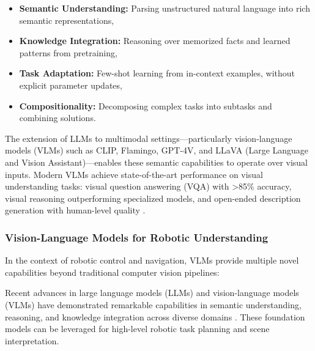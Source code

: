 \begin{itemize}
    \item \textbf{Semantic Understanding:} Parsing unstructured natural language into rich semantic representations,
    \item \textbf{Knowledge Integration:} Reasoning over memorized facts and learned patterns from pretraining,
    \item \textbf{Task Adaptation:} Few-shot learning from in-context examples, without explicit parameter updates,
    \item \textbf{Compositionality:} Decomposing complex tasks into subtasks and combining solutions.
\end{itemize}

The extension of LLMs to multimodal settings—particularly vision-language models (VLMs) such as CLIP, Flamingo, 
GPT-4V, and LLaVA (Large Language and Vision Assistant)—enables these semantic capabilities to operate over visual 
inputs. Modern VLMs achieve state-of-the-art performance on visual understanding tasks: visual question answering (VQA) 
with >85\% accuracy, visual reasoning outperforming specialized models, and open-ended description generation with 
human-level quality \cite{openai2023gpt4, alayrac2022flamingo}.

\subsubsection{Vision-Language Models for Robotic Understanding}

In the context of robotic control and navigation, VLMs provide multiple novel capabilities beyond traditional 
computer vision pipelines:

Recent advances in large language models (LLMs) and vision-language models (VLMs) have
demonstrated remarkable capabilities in semantic understanding, reasoning, and knowledge
integration across diverse domains \cite{openai2023gpt4, alayrac2022flamingo}. These foundation models
can be leveraged for high-level robotic task planning and scene interpretation.



